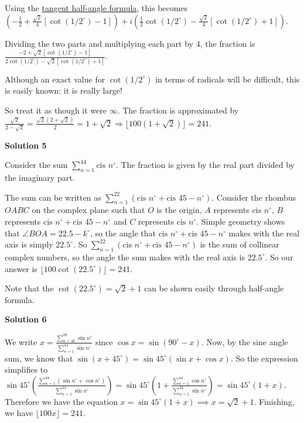 \begin{enumerate}
 Using the \href{https://artofproblemsolving.com/wiki/index.php?title=Trigonometric\_identities}{tangent half-angle formula}, this becomes $\left( - \frac {1}{2} + \frac {\sqrt {2}}{4}[\cot (1/2^\circ) - 1] \right) + i\left( \frac {1}{2}\cot (1/2^\circ) - \frac {\sqrt {2}}{4}[\cot (1/2^\circ) + 1] \right)$.

 Dividing the two parts and multiplying each part by 4, the fraction is $\frac { - 2 + \sqrt {2}[\cot (1/2^\circ) - 1]}{2\cot (1/2^\circ) - \sqrt {2}[\cot (1/2^\circ) + 1]}$.

 Although an exact value for $\cot (1/2^\circ)$ in terms of radicals will be difficult, this is easily known: it is really large!

 So treat it as though it were $\infty$. The fraction is approximated by $\frac {\sqrt {2}}{2 - \sqrt {2}} = \frac {\sqrt {2}(2 + \sqrt {2})}{2} = 1 + \sqrt {2}\Rightarrow \lfloor 100(1+\sqrt2)\rfloor=\boxed{241}$.

 



\textbf{Solution 5}

Consider the sum $\sum_{n = 1}^{44} \text{cis } n^\circ$. The fraction is given by the real part divided by the imaginary part.

 The sum can be written as $\sum_{n=1}^{22} (\text{cis } n^\circ + \text{cis } 45-n^\circ)$. Consider the rhombus $OABC$ on the complex plane such that $O$ is the origin, $A$ represents $\text{cis } n^\circ$, $B$ represents $\text{cis } n^\circ + \text{cis } 45-n^\circ$ and $C$ represents $\text{cis } n^\circ$. Simple geometry shows that $\angle BOA = 22.5-k^\circ$, so the angle that $\text{cis } n^\circ + \text{cis } 45-n^\circ$ makes with the real axis is simply $22.5^\circ$. So $\sum_{n=1}^{22} (\text{cis } n^\circ + \text{cis } 45-n^\circ)$ is the sum of collinear complex numbers, so the angle the sum makes with the real axis is $22.5^\circ$. So our answer is $\lfloor 100 \cot(22.5^\circ) \rfloor = \boxed{241}$. 

 Note that the $\cot(22.5^\circ) = \sqrt2 + 1$ can be shown easily through half-angle formula.

 


 



\textbf{Solution 6}

We write $x =\frac{\sum_{n=46}^{89} \sin n^{\circ}}{\sum_{n=1}^{44} \sin n^{\circ}}$ since $\cos x = \sin (90^{\circ}-x).$ Now, by the sine angle sum, we know that $\sin (x+45^{\circ}) = \sin 45^{\circ}(\sin x + \cos x).$ So the expression simplifies to $\sin 45^{\circ}\left(\frac{\sum_{n=1}^{44} (\sin n^{\circ}+\cos n^{\circ})}{\sum_{n=1}^{44} \sin n^{\circ}}\right) = \sin 45^{\circ}\left(1+\frac{\sum_{n=1}^{44} \cos n^{\circ}}{\sum_{n=1}^{44} \sin n^{\circ}}\right)=\sin 45^{\circ}(1+x).$ Therefore we have the equation $x = \sin 45^{\circ}(1+x) \implies x = \sqrt{2}+1.$ Finishing, we have $\lfloor 100x \rfloor = \boxed{241}.$





\end{enumerate}
